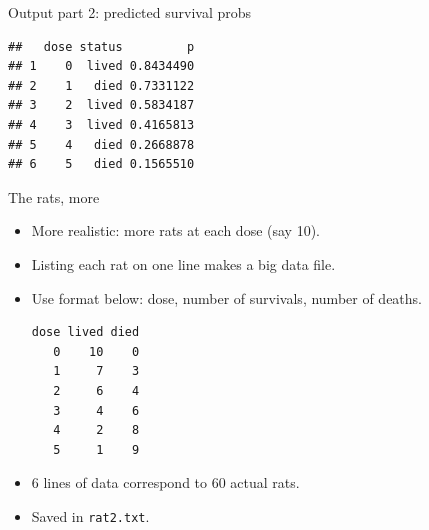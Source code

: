 \begin{frame}[fragile]{Output part 2: predicted survival probs}

  
 
\begin{knitrout}
\color{fgcolor}\begin{kframe}
\begin{alltt}
\hlkwb{=}\hlstd{=}\hlstd{)}
\end{alltt}
\begin{verbatim}
##   dose status         p
## 1    0  lived 0.8434490
## 2    1   died 0.7331122
## 3    2  lived 0.5834187
## 4    3  lived 0.4165813
## 5    4   died 0.2668878
## 6    5   died 0.1565510
\end{verbatim}
\end{kframe}
\end{knitrout}
  
\end{frame}




\begin{frame}[fragile]{The rats, more}

  \begin{itemize}
  \item More realistic: more rats at each dose (say 10).
  \item Listing each rat on one line makes a big data file.
  \item Use format below: dose, number of survivals, number of deaths.
\begin{verbatim}
dose lived died
   0    10    0
   1     7    3 
   2     6    4 
   3     4    6 
   4     2    8 
   5     1    9  
\end{verbatim}


  \item 6 lines of data correspond to 60 actual rats.

  \item Saved in \texttt{rat2.txt}.

  \end{itemize}
  
\end{frame}

